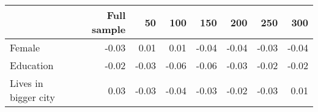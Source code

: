 
\begin{tabular}[t]{lrrrrrrr}
\toprule
  & Full sample & 50 & 100 & 150 & 200 & 250 & 300\\
\midrule
Female & -0.03 & 0.01 & 0.01 & -0.04 & -0.04 & -0.03 & -0.04\\
Education & -0.02 & -0.03 & -0.06 & -0.06 & -0.03 & -0.02 & -0.02\\
Lives in bigger city & 0.03 & -0.03 & -0.04 & -0.03 & -0.02 & -0.03 & 0.01\\
\bottomrule
\end{tabular}
